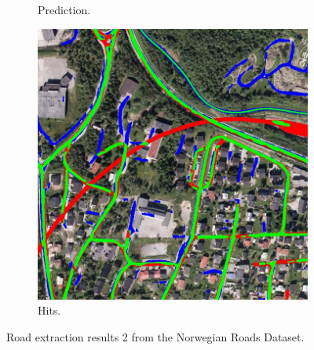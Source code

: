 \begin{figure}[H]
\begin{subfigure}{0.23\textwidth}
\caption{Prediction.}
\vspace{0.2cm} %
\end{subfigure}
\hspace*{\fill} %
\begin{subfigure}{0.23\textwidth}
\includegraphics[width=\textwidth]{figs/appendix/hit1217.jpg}
\caption{Hits.}
\vspace{0.2cm} %
\end{subfigure}
\caption[Norway Road extraction results 2]{Road extraction results 2 from the Norwegian Roads Dataset.} \label{fig:Norway_app_results2}
\end{figure}

